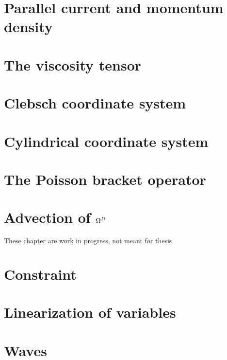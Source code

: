 \documentclass[12pt,a4paper,oneside,openright]{report} %
\begin{document}
\chapter{Parallel current and momentum density}
\label{app:currentMomentum}


\chapter{The viscosity tensor}
\label{app:piTensor}


\chapter{Clebsch coordinate system}
\label{app:Clebsch}


\chapter{Cylindrical coordinate system}
\label{app:cylcoord}


\chapter{The Poisson bracket operator}
\label{app:poisson}


\chapter{Advection of \texorpdfstring{$\Omega^D$}{OmegaD}}
\label{app:vortDAdv}


These chapter are work in progress, not meant for thesis
\chapter{Constraint}


\chapter{Linearization of variables}
\label{app:linearized}


\chapter{Waves}
\label{app:waves}




\end{document}
